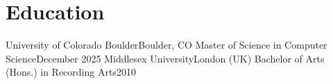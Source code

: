 \section{Education}
  \resumeSubHeadingListStart
    
    \resumeSubheading
      {University of Colorado Boulder}{Boulder, CO}
      {Master of Science in Computer Science}{December 2025}
        \resumeItemListStart
        \resumeItemListEnd
    \resumeSubheading
      {Middlesex University}{London (UK)}
      {Bachelor of Arts (Hons.) in Recording Arts}{2010}
  \resumeSubHeadingListEnd